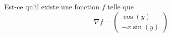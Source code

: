 
\begin{exercice}\label{exoOutilsMath-0130}

    Est-ce qu'il existe une fonction \( f\) telle que
    \begin{equation}
        \nabla f=\begin{pmatrix}
            \cos(y)    \\ 
            -x\sin(y)    
        \end{pmatrix}
    \end{equation}

\end{exercice}

